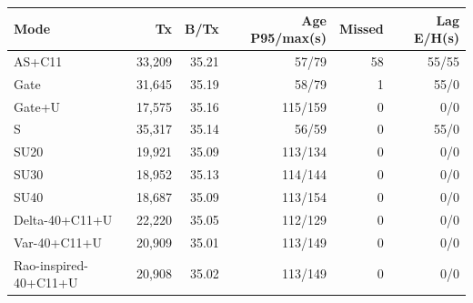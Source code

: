 \setlength{\tabcolsep}{3pt}\begin{tabular}{lrrrrr}\toprule
Mode & Tx & B/Tx & Age P95/max(s) & Missed & Lag E/H(s) \\\midrule
AS+C11 & 33,209 & 35.21 & 57/79 & 58 & 55/55 \\
Gate & 31,645 & 35.19 & 58/79 & 1 & 55/0 \\
Gate+U & 17,575 & 35.16 & 115/159 & 0 & 0/0 \\
S & 35,317 & 35.14 & 56/59 & 0 & 55/0 \\
SU20 & 19,921 & 35.09 & 113/134 & 0 & 0/0 \\
SU30 & 18,952 & 35.13 & 114/144 & 0 & 0/0 \\
SU40 & 18,687 & 35.09 & 113/154 & 0 & 0/0 \\
Delta-40+C11+U & 22,220 & 35.05 & 112/129 & 0 & 0/0 \\
Var-40+C11+U & 20,909 & 35.01 & 113/149 & 0 & 0/0 \\
Rao-inspired-40+C11+U & 20,908 & 35.02 & 113/149 & 0 & 0/0 \\
\bottomrule\end{tabular}
